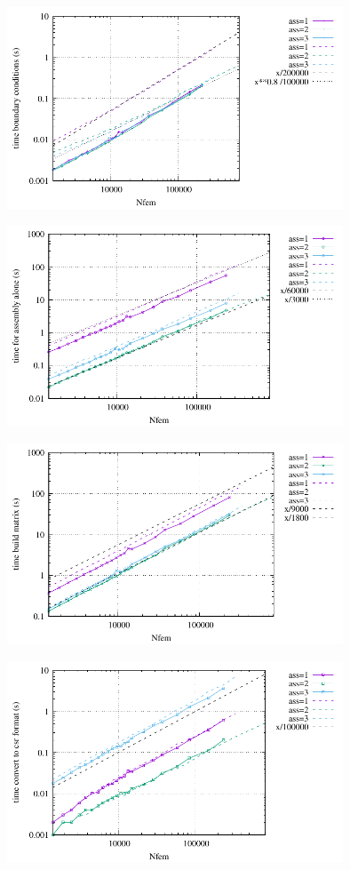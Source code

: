 \begin{center}
\includegraphics[width=10cm]{python_codes/fieldstone_182/RESULTS/times_bc.pdf}
\end{center}

\begin{center}
\includegraphics[width=10cm]{python_codes/fieldstone_182/RESULTS/times_assembly.pdf}
\end{center}

\begin{center}
\includegraphics[width=10cm]{python_codes/fieldstone_182/RESULTS/times_build.pdf}
\end{center}

\begin{center}
\includegraphics[width=10cm]{python_codes/fieldstone_182/RESULTS/times_convert.pdf}
\end{center}

